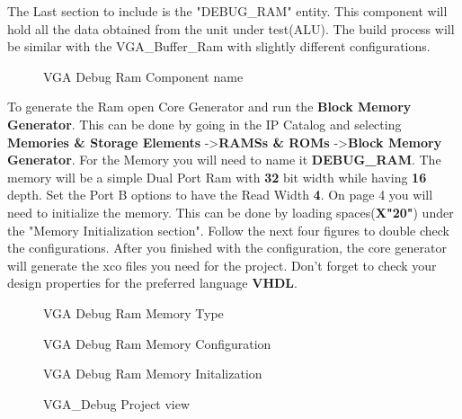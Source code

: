 \documentclass{article}
\begin{document}
The Last section to include is the "DEBUG\_RAM" entity. This component will hold all the data obtained from the unit under test(ALU). The build process will be similar with the VGA\_Buffer\_Ram with slightly different configurations.

\begin{figure}[!htbp]
  \centering
  \caption{VGA Debug Ram Component name}
  \label{fig:projectview}
\end{figure}

To generate the Ram open Core Generator and run the \textbf{Block Memory Generator}. This can be done by going in the IP Catalog and selecting \textbf{Memories \& Storage Elements} -\textgreater \textbf{RAMSs \& ROMs} -\textgreater \textbf{Block Memory Generator}. For the Memory you will need to name it \textbf{DEBUG\_RAM}. The memory will be a simple Dual Port Ram with \textbf{32} bit width while having \textbf{16} depth. Set the Port B options to have the Read Width \textbf{4}. On page 4 you will need to initialize the memory. This can be done by loading spaces(\textbf{X"20"}) under the "Memory Initialization section". Follow the next four figures to double check the configurations. After you finished with the configuration, the core generator will generate the xco files you need for the project. Don't forget to check your design properties for the preferred language \textbf{VHDL}. 


\begin{figure}[!htbp]
  \centering
  \caption{VGA Debug Ram Memory Type}
\end{figure}

\begin{figure}[!htbp]
  \centering
  \caption{VGA Debug Ram Memory Configuration}
\end{figure}

\begin{figure}[!htbp]
  \centering
  \caption{VGA Debug Ram Memory Initalization}
\end{figure}

\begin{figure}[!htbp]
  \centering
  \caption{VGA\_Debug Project view}
\end{figure}
\end{document}
